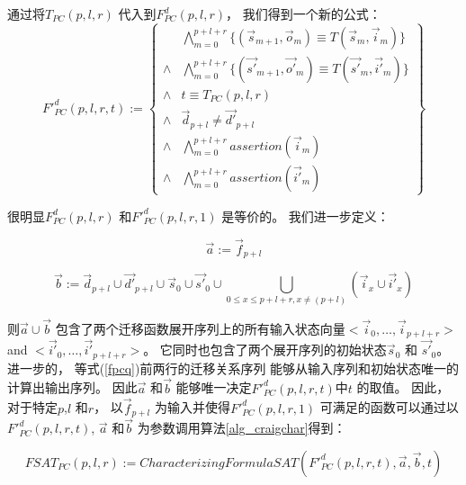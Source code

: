 通过将$T_{PC}(p,l,r)$ 代入到$F^d_{PC}(p,l,r)$，
我们得到一个新的公式：
\begin{equation}\label{fpcq}
F'^d_{PC}(p,l,r,t):=
\left\{
\begin{array}{cc}
&\bigwedge_{m=0}^{p+l+r}
\{
(\vec{s}_{m+1},\vec{o}_m)\equiv T(\vec{s}_m,\vec{i}_m)
\}
\\
\wedge&\bigwedge_{m=0}^{p+l+r}
\{
(\vec{s'}_{m+1},\vec{o'}_m)\equiv T(\vec{s'}_m,\vec{i'}_m)
\}
\\
\wedge& t\equiv T_{PC}(p,l,r)\\
\wedge& \vec{d}_{p+l}\ne \vec{d'}_{p+l} \\
\wedge&\bigwedge_{m=0}^{p+l+r}assertion(\vec{i}_m) \\
\wedge&\bigwedge_{m=0}^{p+l+r}assertion(\vec{i'}_m)
\end{array}
\right\}
\end{equation}


很明显$F^d_{PC}(p,l,r)$ 和$F'^d_{PC}(p,l,r,1)$ 是等价的。
我们进一步定义：

\begin{equation}\label{pcdef1}
\vec{a}:=\vec{f}_{p+l}
\end{equation}

\begin{equation}\label{pcdef2}
\vec{b}:=\vec{d}_{p+l}\cup \vec{d'}_{p+l}\cup \vec{s}_0\cup \vec{s'}_0\cup\bigcup_{0\le x\le p+l+r,x\neq (p+l)}(\vec{i}_{x}\cup\vec{i'}_{x})
\end{equation}

则$\vec{a}\cup\vec{b}$ 包含了两个迁移函数展开序列上的所有输入状态向量$<\vec{i}_0,\dots,\vec{i}_{p+l+r}>$ and $<\vec{i'}_0,\dots,\vec{i'}_{p+l+r}>$。
它同时也包含了两个展开序列的初始状态$\vec{s}_0$ 和 $\vec{s'}_0$。
进一步的，
等式(\ref{fpcq})前两行的迁移关系序列
能够从输入序列和初始状态唯一的计算出输出序列。
因此$\vec{a}$ 和$\vec{b}$ 能够唯一决定$F'^d_{PC}(p,l,r,t)$中$t$ 的取值。
因此，
对于特定$p$,$l$ 和$r$，
以$\vec{f}_{p+l}$ 为输入并使得$F'^d_{PC}(p,l,r,1)$ 可满足的函数可以通过以$F'^d_{PC}(p,l,r,t)$, $\vec{a}$ 和$\vec{b}$ 为参数调用算法\ref{alg_craigchar}得到：

\begin{equation}\label{fsat_pc}
FSAT_{PC}(p,l,r):=CharacterizingFormulaSAT(F'^d_{PC}(p,l,r,t),\vec{a},\vec{b},t)
\end{equation}

